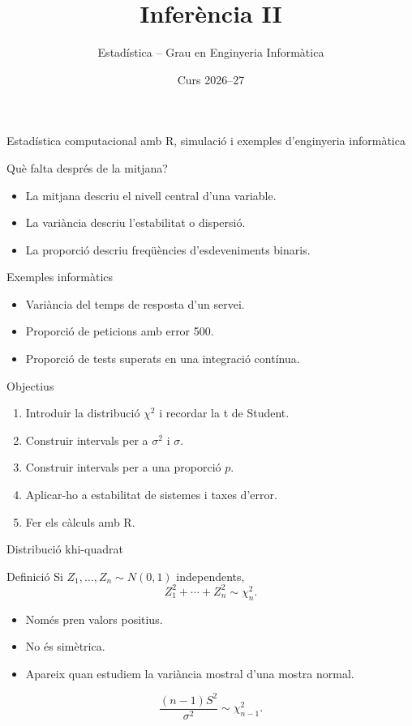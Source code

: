 \documentclass[10pt,aspectratio=169]{beamer}
\title[Inferència II]{Inferència II}
\author{Estadística -- Grau en Enginyeria Informàtica}
\date{Curs 2026--27}
\newcommand{\R}{\textsf{R}}
\begin{document}
\begin{frame}[plain]
  \titlepage
  \vspace{-0.45cm}
  \begin{center}
  \small\textcolor{DeepBlue}{Estadística computacional amb \R, simulació i exemples d'enginyeria informàtica}
  \end{center}
\end{frame}


\begin{frame}[fragile]{Què falta després de la mitjana?}
\begin{itemize}
  \item La mitjana descriu el nivell central d'una variable.
  \item La variància descriu l'estabilitat o dispersió.
  \item La proporció descriu freqüències d'esdeveniments binaris.
\end{itemize}
\begin{block}{Exemples informàtics}
\begin{itemize}
  \item Variància del temps de resposta d'un servei.
  \item Proporció de peticions amb error 500.
  \item Proporció de tests superats en una integració contínua.
\end{itemize}
\end{block}
\end{frame}

\begin{frame}[fragile]{Objectius}
\begin{enumerate}
  \item Introduir la distribució $\chi^2$ i recordar la t de Student.
  \item Construir intervals per a $\sigma^2$ i $\sigma$.
  \item Construir intervals per a una proporció $p$.
  \item Aplicar-ho a estabilitat de sistemes i taxes d'error.
  \item Fer els càlculs amb \R.
\end{enumerate}
\end{frame}

\begin{frame}[fragile]{Distribució khi-quadrat}
\begin{block}{Definició}
Si $Z_1,\ldots,Z_n\sim N(0,1)$ independents,
\[
Z_1^2+\cdots+Z_n^2\sim \chi^2_n.
\]
\end{block}
\begin{itemize}
  \item Només pren valors positius.
  \item No és simètrica.
  \item Apareix quan estudiem la variància mostral d'una mostra normal.
\end{itemize}
\[
\frac{(n-1)S^2}{\sigma^2}\sim \chi^2_{n-1}.
\]
\end{frame}
\end{document}
